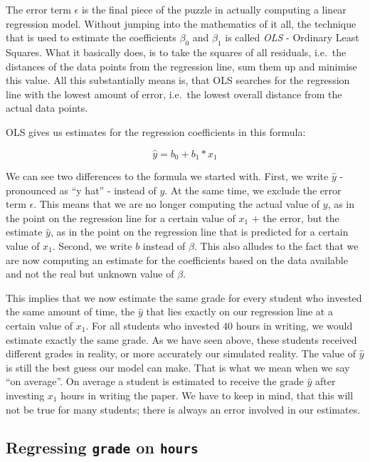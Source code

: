 \documentclass[
]{book}
\begin{document}
The error term \(\epsilon\) is the final piece of the puzzle in actually computing
a linear regression model. Without jumping into the mathematics of it all, the
technique that is used to estimate the coefficients \(\beta_0\) and \(\beta_1\) is
called \emph{OLS} - Ordinary Least Squares. What it basically does, is to take the
squares of all residuals, i.e.~the distances of the data points from the
regression line, sum them up and minimise this value. All this substantially
means is, that OLS searches for the regression line with the lowest amount of error,
i.e.~the lowest overall distance from the actual data points.

OLS gives us estimates for the regression coefficients in this formula:

\[\hat{y} = b_0 +b_1*x_1\]

We can see two differences to the formula we started with. First, we write
\(\hat{y}\) - pronounced as ``y hat'' - instead of \(y\). At the same time, we exclude
the error term \(\epsilon\). This means that we are no longer computing the actual
value of \(y\), as in the point on the regression line for a certain value of
\(x_1\) \(+\) the error, but the estimate \(\hat{y}\), as in the point on the
regression line that is predicted for a certain value of \(x_1\). Second, we write
\(b\) instead of \(\beta\). This also alludes to the fact that we are now
computing an estimate for the coefficients based on the data available and not
the real but unknown value of \(\beta\).

This implies that we now estimate the same grade for every student who invested
the same amount of time, the \(\hat{y}\) that lies exactly on our regression line
at a certain value of \(x_1\). For all students who invested \(40\) hours in writing,
we would estimate exactly the same grade. As we have seen above, these students
received different grades in reality, or more accurately our simulated reality.
The value of \(\hat{y}\) is still the best guess our model can make. That is what
we mean when we say ``on average''. On average a student is estimated to receive
the grade \(\hat{y}\) after investing \(x_1\) hours in writing the paper. We have
to keep in mind, that this will not be true for many students; there is always
an error involved in our estimates.

\hypertarget{regressing-grade-on-hours}{%
\subsection{\texorpdfstring{Regressing \texttt{grade} on \texttt{hours}}{Regressing grade on hours}}\label{regressing-grade-on-hours}}
\end{document}
